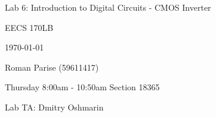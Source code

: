 \centering
\vspace{2.5cm}
{\huge Lab 6: Introduction to Digital Circuits - CMOS Inverter \par}
{\Large EECS 170LB \par}
{\Large \today \par}
\vspace{1cm}
{\large Roman Parise (59611417) \par}
{\large \par}
\vspace{1cm}
{\large Thursday 8:00am - 10:50am Section 18365 \par}
{\large Lab TA: Dmitry Oshmarin \par}
\vspace{1cm}
